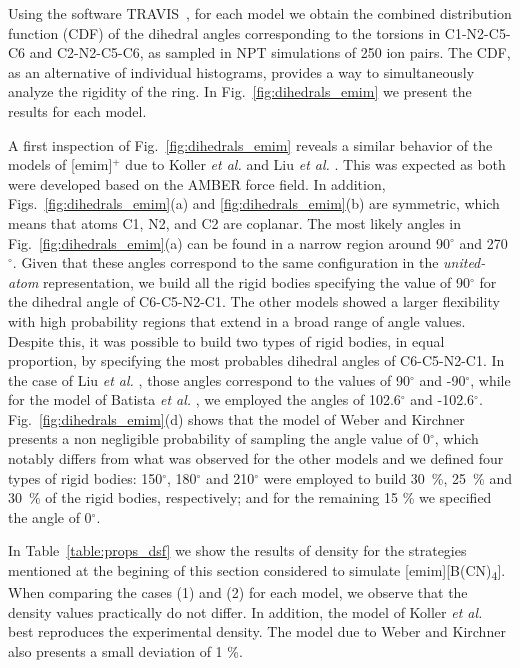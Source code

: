 \documentclass[3p,twocolumn]{elsarticle}
\begin{document}
Using the software TRAVIS~\cite{Brehm_2011}, for each model we obtain the combined distribution function (CDF) of the dihedral angles corresponding to the torsions in C1-N2-C5-C6 and C2-N2-C5-C6, as sampled in NPT simulations of 250 ion pairs. The CDF, as an alternative of individual histograms, provides a way to  simultaneously analyze the rigidity of the ring. In Fig.~\ref{fig:dihedrals_emim} we present the results for each model.

A first inspection of Fig.~\ref{fig:dihedrals_emim} reveals a similar behavior of the models of [emim]$^{+}$ due to Koller \textit{et al.} \cite{Koller_2012} and Liu \textit{et al.} \cite{Liu_2014}. This was expected as both were developed based on the AMBER force field. In addition, Figs.~\ref{fig:dihedrals_emim}(a) and \ref{fig:dihedrals_emim}(b) are symmetric, which means that atoms C1, N2, and C2 are coplanar. The most likely angles in Fig.~\ref{fig:dihedrals_emim}(a) can be found in a narrow region around 90$^{\circ}$ and 270$^{\circ}$. Given that these angles correspond to the same configuration in the \textit{united-atom} representation, we build all the rigid bodies specifying the value of 90$^{\circ}$ for the dihedral angle of C6-C5-N2-C1. The other models showed a larger flexibility with high probability regions that extend in a broad range of angle values. Despite this, it was possible to build two types of rigid bodies, in equal proportion, by specifying the most probables dihedral angles of C6-C5-N2-C1. In the case of Liu \textit{et al.} \cite{Liu_2014}, those angles correspond to the values of  90$^{\circ}$ and -90$^{\circ}$, while for the model of Batista \textit{et al.} \cite{Batista_2015}, we employed the angles of 102.6$^{\circ}$ and -102.6$^{\circ}$. Fig.~\ref{fig:dihedrals_emim}(d) shows that the model of Weber and Kirchner \cite{Weber_2016} presents a non negligible probability of sampling the angle value of 0$^{\circ}$, which notably differs from what was observed for the other models and we defined four types of rigid bodies: 150$^{\circ}$, 180$^{\circ}$ and 210$^{\circ}$ were employed to build 30~\%, 25~\% and 30~\% of the rigid bodies, respectively; and for the remaining 15 \% we specified the angle of 0$^{\circ}$.

In Table~\ref{table:props_dsf} we show the results of density for the strategies mentioned at the begining of this section considered to simulate [emim][B(CN)\textsubscript{4}]. When comparing the cases (1) and (2) for each model, we observe that the density values practically do not differ. In addition, the model of Koller \textit{et al.} \cite{Koller_2012} best reproduces the experimental density. The model due to Weber and Kirchner also presents a small deviation of 1 \%. 
\end{document}
